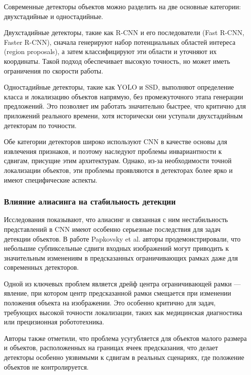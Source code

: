Современные детекторы объектов можно разделить на две основные категории: двухстадийные и одностадийные.

Двухстадийные детекторы, такие как R-CNN \cite{redmon2016yolo} и его последователи (Fast R-CNN, Faster R-CNN), сначала генерируют набор потенциальных областей интереса (region proposals), а затем классифицируют эти области и уточняют их координаты. Такой подход обеспечивает высокую точность, но может иметь ограничения по скорости работы.

Одностадийные детекторы, такие как YOLO \cite{redmon2016yolo} и SSD, выполняют определение класса и локализацию объектов напрямую, без промежуточного этапа генерации предложений. Это позволяет им работать значительно быстрее, что критично для приложений реального времени, хотя исторически они уступали двухстадийным детекторам по точности.

Обе категории детекторов широко используют CNN в качестве основы для извлечения признаков, и поэтому наследуют проблемы инвариантности к сдвигам, присущие этим архитектурам. Однако, из-за необходимости точной локализации объектов, эти проблемы проявляются в детекторах более ярко и имеют специфические аспекты.

\subsubsection{Влияние алиасинга на стабильность детекции}
\label{review:detectors:aliasing}

Исследования показывают, что алиасинг и связанная с ним нестабильность представлений в CNN имеют особенно серьезные последствия для задач детекции объектов. В работе Papkovsky et al. \cite{papkovsky2023shift} авторы продемонстрировали, что небольшие субпиксельные сдвиги входных изображений могут приводить к значительным изменениям в предсказанных ограничивающих рамках даже для современных детекторов.

Одной из ключевых проблем является дрейф центра ограничивающей рамки — явление, при котором центр предсказанной рамки смещается при изменении положения объекта на изображении. Это особенно критично для задач, требующих высокой точности локализации, таких как медицинская диагностика или прецизионная робототехника.

Авторы также отметили, что проблема усугубляется для объектов малого размера и объектов, расположенных на границах ячеек предсказания, что делает детекторы особенно уязвимыми к сдвигам в реальных сценариях, где положение объектов не контролируется.

